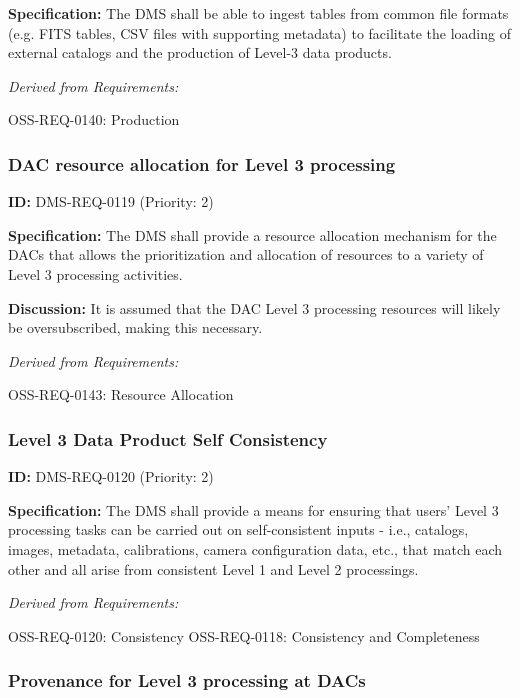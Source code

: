 \documentclass[SE,toc,lsstdraft]{lsstdoc}
\begin{document}
\textbf{Specification:} The DMS shall be able to ingest tables from common file formats (e.g. FITS tables, CSV files with supporting metadata) to facilitate the loading of external catalogs and the production of Level-3 data products.

\emph{Derived from Requirements:}

OSS-REQ-0140:
Production \newline

\subsubsection{DAC resource allocation for Level 3 processing}

\label{DMS-REQ-0119}
\textbf{ID:} DMS-REQ-0119 (Priority: 2)

\textbf{Specification:} The DMS shall provide a resource allocation mechanism for the DACs that allows the prioritization and allocation of resources to a variety of Level 3 processing activities.

\textbf{Discussion:} It is assumed that the DAC Level 3 processing resources will likely be oversubscribed, making this necessary.

\emph{Derived from Requirements:}

OSS-REQ-0143:
Resource Allocation \newline

\subsubsection{Level 3 Data Product Self Consistency}

\label{DMS-REQ-0120}
\textbf{ID:} DMS-REQ-0120 (Priority: 2)

\textbf{Specification:} The DMS shall provide a means for ensuring that users' Level 3 processing tasks can be carried out on self-consistent inputs - i.e., catalogs, images, metadata, calibrations, camera configuration data, etc., that match each other and all arise from consistent Level 1 and Level 2 processings.

\emph{Derived from Requirements:}

OSS-REQ-0120:
Consistency \newline
OSS-REQ-0118:
Consistency and Completeness \newline

\subsubsection{Provenance for Level 3 processing at DACs}
\end{document}
